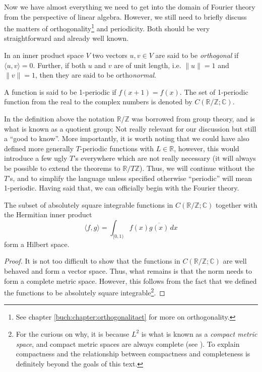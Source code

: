 Now we have almost everything we need to get into the domain of Fourier theory
from the perspective of linear algebra. However, we still need to briefly
discuss the matters of orthogonality\footnote{See chapter
\ref{buch:chapter:orthogonalitaet} for more on orthogonality.} and
periodicity. Both should be very straightforward and already well known.

\begin{definition}
  \label{kugel:def:orthogonality}
  In an inner product space \(V\) two vectors \(u, v \in V\) are said to be
  \emph{orthogonal} if \(\langle u, v \rangle = 0\). Further, if both \(u\)
  and \(v\) are of unit length, i.e. \(\| u \| = 1\) and \(\| v \| = 1\), then
  they are said to be ortho\emph{normal}.
\end{definition}

\begin{definition}
  A function is said to be 1-periodic if \(f(x + 1) = f(x)\). The set of
  1-periodic function from the real to the complex
  numbers is denoted by \(C(\mathbb{R}/\mathbb{Z}; \mathbb{C})\).
\end{definition}

In the definition above the notation \(\mathbb{R}/\mathbb{Z}\) was borrowed
from group theory, and is what is known as a quotient group; Not really
relevant for our discussion but still a ``good to know''. More importantly, it
is worth noting that we could have also defined more generally \(T\)-periodic
functions with \(L\in\mathbb{R}\), however, this would introduce a few ugly
\(T\)'s everywhere which are not really necessary (it will always be possible
to extend the theorems to \(\mathbb{R} / T\mathbb{Z}\)). Thus, we will
continue without the \(T\)'s, and to simplify the language unless specified
otherwise ``periodic'' will mean 1-periodic. Having said that, we can
officially begin with the Fourier theory.

\begin{lemma}
  \label{kugel:thm:sqint-hilbert}
  The subset of absolutely square integrable functions in
  \(C(\mathbb{R}/\mathbb{Z}; \mathbb{C})\) together with the Hermitian inner
  product
  \[
    \langle f, g \rangle = \int_{[0, 1)} f(x) \overline{g(x)} \, dx
  \]
  form a Hilbert space.
\end{lemma}
\begin{proof}
  It is not too difficult to show that the functions in \(C(\mathbb{R} /
  \mathbb{Z}; \mathbb{C})\) are well behaved and form a vector space. Thus,
  what remains is that the norm needs to form a complete metric space.
  However, this follows from the fact that we defined the functions to be
  absolutely square integrable\footnote{For the curious on why, it is because
  \(L^2\) is what is known as a \emph{compact metric space}, and compact
  metric spaces are always complete (see \cite{eck_metric_2022,
  tao_analysis_2016}). To explain compactness and the relationship between
  compactness and completeness is definitely beyond the goals of this text.}.
\end{proof}

